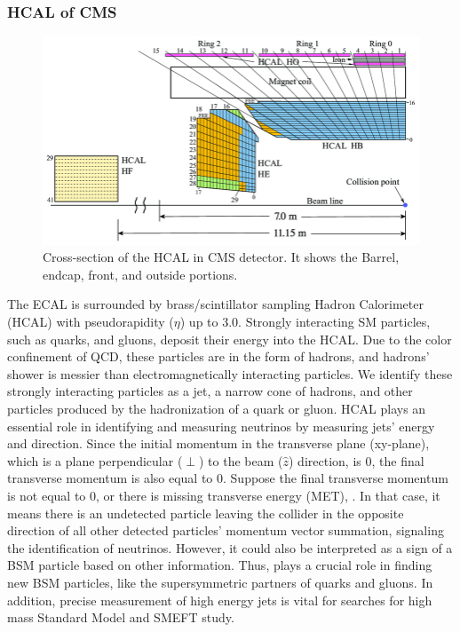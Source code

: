 \subsubsection{HCAL of CMS}
\begin{figure}[h!]
  \caption{Cross-section of the HCAL in CMS detector. It shows the Barrel, endcap, front, and outside portions. \cite{hcal}}
  \label{fig:HCAL}
  \centering
  \includegraphics[width=0.87\linewidth]{figs/HCAL.png}
\end{figure}
The ECAL is surrounded by brass/scintillator sampling Hadron Calorimeter (HCAL) with pseudorapidity ($\eta$) up to 3.0.
Strongly interacting SM particles, such as quarks, and gluons, deposit their energy into the HCAL.
Due to the color confinement of QCD, these particles are in the form of hadrons, and hadrons' shower is messier than electromagnetically interacting particles.
We identify these strongly interacting particles as a jet, a narrow cone of hadrons, and other particles produced by the hadronization of a quark or gluon.
HCAL plays an essential role in identifying and measuring neutrinos by measuring jets' energy and direction.
Since the initial momentum in the transverse plane (xy-plane), which is a plane perpendicular ($\perp$) to the beam ($\hat{z}$) direction, is 0, the final transverse momentum is also equal to 0.
Suppose the final transverse momentum is not equal to 0, or there is missing transverse energy (MET), \MET. In that case, it means there is an undetected particle leaving the collider in the opposite direction of all other detected particles' momentum vector summation, signaling the identification of neutrinos.
However, it could also be interpreted as a sign of a BSM particle based on other information.
Thus, \MET plays a crucial role in finding new BSM particles, like the supersymmetric partners of quarks and gluons.
In addition, precise measurement of high energy jets is vital for searches for high mass Standard Model and SMEFT study.

